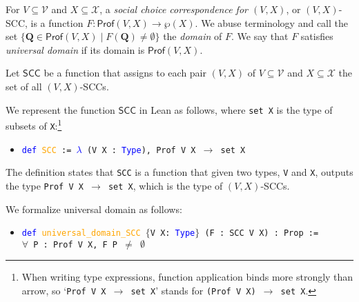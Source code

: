 \documentclass[runningheads]{llncs}
\begin{document}



\begin{definition} \textnormal{For $V\subseteq\mathcal{V}$ and $X\subseteq\mathcal{X}$, a \textit{social choice correspondence for $(V,X)$}, or $(V,X)$-SCC, is a function  $F: \mathsf{Prof}(V,X)\to \wp(X)$. We abuse terminology and call the set $\{\mathbf{Q}\in\mathsf{Prof}(V,X)\mid F(\mathbf{Q})\neq\emptyset \}$ the \textit{domain} of $F$. We say that $F$ satisfies \textit{universal domain} if its domain is $\mathsf{Prof}(V,X)$.}

\textnormal{Let $\mathsf{SCC}$ be a function that assigns to each pair $(V,X)$ of $V\subseteq\mathcal{V}$ and $X\subseteq\mathcal{X}$ the set of all $(V,X)$-SCCs.}
\end{definition}

We represent the function $\mathsf{SCC}$ in Lean as follows, where \texttt{set X} is the type of subsets of \texttt{X}:\footnote{When writing type expressions, function application binds more strongly than arrow, so `\texttt{Prof V X $\to$ set X}' stands for \texttt{(Prof V X) $\to$ set X}.}
\begin{itemize}
\item[] \texttt{\textcolor{blue}{def} \textcolor{orange}{SCC} := \textcolor{blue}{$\lambda$} (V X : \textcolor{blue}{Type}), Prof V X $\to$ set X}
\end{itemize}
The definition states that \texttt{SCC} is a function that given two types, \texttt{V} and \texttt{X}, outputs the type \texttt{Prof V X $\to$ set X}, which is the type of $(V,X)$-SCCs. 

We formalize universal domain as follows:
\begin{itemize}
\item[] \texttt{\textcolor{blue}{def} \textcolor{orange}{universal\_domain\_SCC} $\{$V X: \textcolor{blue}{Type}$\}$ (F : SCC V X) : Prop :=} \\
\texttt{$\forall$ P : Prof V X, F P $\neq$ $\emptyset$}

\end{itemize}
\end{document}
